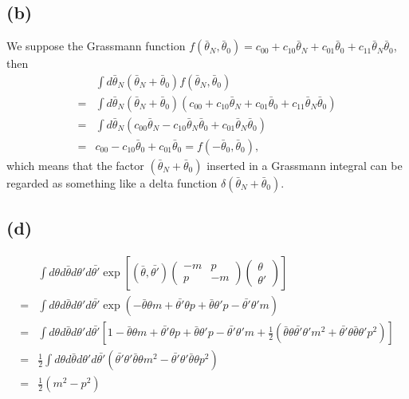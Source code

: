 \documentclass[12pt]{article}
\begin{document}
\subsection*{(b)}

We suppose the Grassmann function 
$f(\bar{\theta}_N,\bar{\theta}_0)=c_{00}+c_{10}\bar{\theta}_N+c_{01}
\bar{\theta}_0+c_{11}\bar{\theta}_N\bar{\theta}_0$, then
\begin{equation*}
    \begin{split}
        &\int d\bar{\theta}_N(\bar{\theta}_N+\bar{\theta}_0)
        f(\bar{\theta}_N,\bar{\theta}_0)\\
        =&\int d\bar{\theta}_N(\bar{\theta}_N+\bar{\theta}_0)
        (c_{00}+c_{10}\bar{\theta}_N+c_{01}\bar{\theta}_0+c_{11}
        \bar{\theta}_N\bar{\theta}_0)\\
        =&\int d\bar{\theta}_N(c_{00}\bar{\theta}_N-c_{10}\bar{\theta}_N
        \bar{\theta}_0+c_{01}\bar{\theta}_N\bar{\theta}_0)\\
        =&c_{00}-c_{10}\bar{\theta}_0+c_{01}\bar{\theta}_0
        =f(-\bar{\theta}_0,\bar{\theta}_0),
    \end{split}
\end{equation*}
which means that the factor $(\bar{\theta}_N+\bar{\theta}_0)$ inserted in 
a Grassmann integral can be regarded as something like a delta function 
$\delta(\bar{\theta}_N+\bar{\theta}_0)$.

\subsection*{(d)}

\begin{equation*}
    \begin{split}
        &\int d\theta d\bar{\theta}d\theta'd\bar{\theta'}\exp\left[
        (\bar{\theta},\bar{\theta'})\left(\begin{matrix}
        -m  &p\\
        p  &-m
        \end{matrix}\right)\left(\begin{matrix}
        \theta\\
        \theta'
        \end{matrix}\right)
        \right]\\
        =&\int d\theta d\bar{\theta}d\theta'd\bar{\theta'}\exp(-\bar{\theta}
        \theta m+\bar{\theta'}\theta p+\bar{\theta}\theta'p-\bar{\theta'}
        \theta'm)\\
        =&\int d\theta d\bar{\theta}d\theta'd\bar{\theta'}[1-\bar{\theta}
        \theta m+\bar{\theta'}\theta p+\bar{\theta}\theta'p-\bar{\theta'}
        \theta'm+\frac{1}{2}(\bar{\theta}\theta\bar{\theta'}\theta'm^2+
        \bar{\theta'}\theta\bar{\theta}\theta'p^2)]\\
        =&\frac{1}{2}\int d\theta d\bar{\theta}d\theta'd\bar{\theta'}
        (\bar{\theta'}\theta'\bar{\theta}\theta m^2-\bar{\theta'}\theta'
        \bar{\theta}\theta p^2)\\
        =&\frac{1}{2}(m^2-p^2)
    \end{split}
\end{equation*}
\end{document}
